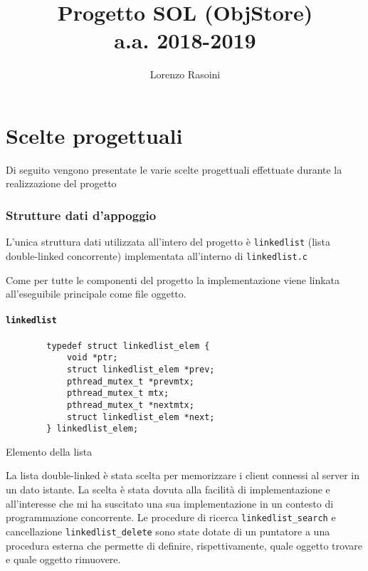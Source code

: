 \documentclass[a4paper,11pt]{article}
\begin{document}
\title{{\textbf{Progetto SOL (ObjStore)\\a.a. 2018-2019}}}
\author{Lorenzo Rasoini}
\date{}
\maketitle

\tableofcontents
\newpage

\part*{Scelte progettuali}
Di seguito vengono presentate le varie scelte progettuali effettuate durante la realizzazione del progetto
\section{Strutture dati d'appoggio}
L'unica struttura dati utilizzata all'intero del progetto è \texttt{linkedlist} (lista double-linked concorrente) implementata all'interno
di \texttt{linkedlist.c}

Come per tutte le componenti del progetto la implementazione viene linkata all'eseguibile principale come file oggetto.

\subsection{\texttt{linkedlist}}
\begin{listing}[ht]
    \begin{verbatim}
        typedef struct linkedlist_elem {
            void *ptr;
            struct linkedlist_elem *prev;
            pthread_mutex_t *prevmtx;
            pthread_mutex_t mtx;
            pthread_mutex_t *nextmtx;
            struct linkedlist_elem *next;
        } linkedlist_elem;
        \end{verbatim}
        \caption{Elemento della lista}
    \end{listing}
La lista double-linked è stata scelta per memorizzare i client connessi al server in un dato istante.
La scelta è stata dovuta alla facilità di implementazione e all'interesse che mi ha suscitato una sua implementazione in un contesto di programmazione concorrente.
Le procedure di ricerca \texttt{linkedlist\_search} e cancellazione \texttt{linkedlist\_delete} sono state dotate di un puntatore a una procedura esterna che permette di definire, rispettivamente, quale oggetto trovare e quale oggetto rimuovere.
\end{document}
